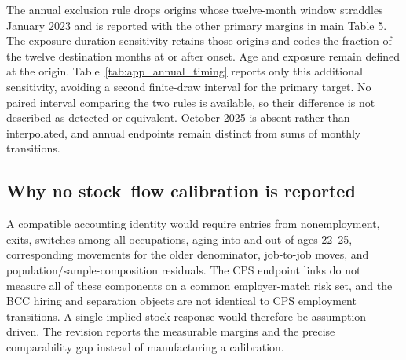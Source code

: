 

The annual exclusion rule drops origins whose twelve-month window straddles
January 2023 and is reported with the other primary margins in
main Table 5.  The exposure-duration sensitivity retains those origins
and codes the fraction of the twelve destination months at or after onset.  Age
and exposure remain defined at the origin.  Table~\ref{tab:app_annual_timing}
reports only this additional sensitivity, avoiding a second finite-draw
interval for the primary target.  No paired interval comparing the two rules
is available, so their difference is not described as detected or equivalent.
October 2025 is absent rather than interpolated, and annual endpoints remain
distinct from sums of monthly transitions.



\subsection{Why no stock--flow calibration is reported}

A compatible accounting identity would require entries from nonemployment, exits, switches among all occupations, aging into and out of ages 22--25, corresponding movements for the older denominator, job-to-job moves, and population/sample-composition residuals.  The CPS endpoint links do not measure all of these components on a common employer-match risk set, and the BCC hiring and separation objects are not identical to CPS employment transitions.  A single implied stock response would therefore be assumption driven.  The revision reports the measurable margins and the precise comparability gap instead of manufacturing a calibration.
